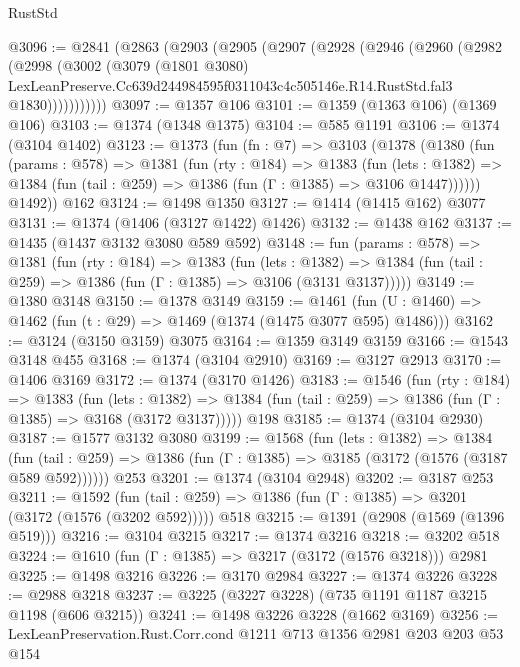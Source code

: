 \begin{lexlean}{RustStd}
\begin{coremodule}
@3096 := @2841
    (@2863
      (@2903
        (@2905
          (@2907
            (@2928
              (@2946
                (@2960
                  (@2982
                    (@2998
                      (@3002
                        (@3079
                          (@1801 @3080)
                          LexLeanPreserve.Cc639d244984595f0311043c4c505146e.R14.RustStd.fal3
                          @1830)))))))))))
@3097 := @1357 @106
@3101 := @1359 (@1363 @106) (@1369 @106)
@3103 := @1374 (@1348 @1375)
@3104 := @585 @1191
@3106 := @1374 (@3104 @1402)
@3123 := @1373
    (fun (fn : @7) =>
    @3103
      (@1378
        (@1380
          (fun (params : @578) =>
          @1381
            (fun (rty : @184) =>
            @1383
              (fun (lets : @1382) =>
              @1384 (fun (tail : @259) => @1386 (fun (Γ : @1385) => @3106 @1447))))))
        @1492))
    @162
@3124 := @1498 @1350
@3127 := @1414 (@1415 @162) @3077
@3131 := @1374 (@1406 (@3127 @1422) @1426)
@3132 := @1438 @162
@3137 := @1435 (@1437 @3132 @3080 @589 @592)
@3148 := fun (params : @578) =>
  @1381
    (fun (rty : @184) =>
    @1383
      (fun (lets : @1382) =>
      @1384 (fun (tail : @259) => @1386 (fun (Γ : @1385) => @3106 (@3131 @3137)))))
@3149 := @1380 @3148
@3150 := @1378 @3149
@3159 := @1461 (fun (U : @1460) => @1462 (fun (t : @29) => @1469 (@1374 (@1475 @3077 @595) @1486)))
@3162 := @3124 (@3150 @3159) @3075
@3164 := @1359 @3149 @3159
@3166 := @1543 @3148 @455
@3168 := @1374 (@3104 @2910)
@3169 := @3127 @2913
@3170 := @1406 @3169
@3172 := @1374 (@3170 @1426)
@3183 := @1546
    (fun (rty : @184) =>
    @1383
      (fun (lets : @1382) =>
      @1384 (fun (tail : @259) => @1386 (fun (Γ : @1385) => @3168 (@3172 @3137)))))
    @198
@3185 := @1374 (@3104 @2930)
@3187 := @1577 @3132 @3080
@3199 := @1568
    (fun (lets : @1382) =>
    @1384 (fun (tail : @259) => @1386 (fun (Γ : @1385) => @3185 (@3172 (@1576 (@3187 @589 @592))))))
    @253
@3201 := @1374 (@3104 @2948)
@3202 := @3187 @253
@3211 := @1592
    (fun (tail : @259) => @1386 (fun (Γ : @1385) => @3201 (@3172 (@1576 (@3202 @592)))))
    @518
@3215 := @1391 (@2908 (@1569 (@1396 @519)))
@3216 := @3104 @3215
@3217 := @1374 @3216
@3218 := @3202 @518
@3224 := @1610 (fun (Γ : @1385) => @3217 (@3172 (@1576 @3218))) @2981
@3225 := @1498 @3216
@3226 := @3170 @2984
@3227 := @1374 @3226
@3228 := @2988 @3218
@3237 := @3225 (@3227 @3228) (@735 @1191 @1187 @3215 @1198 (@606 @3215))
@3241 := @1498 @3226 @3228 (@1662 @3169)
@3256 := LexLeanPreservation.Rust.Corr.cond
    @1211
    @713
    @1356
    @2981
    @203
    @203
    @53
    @154

\end{coremodule}
\end{lexlean}
